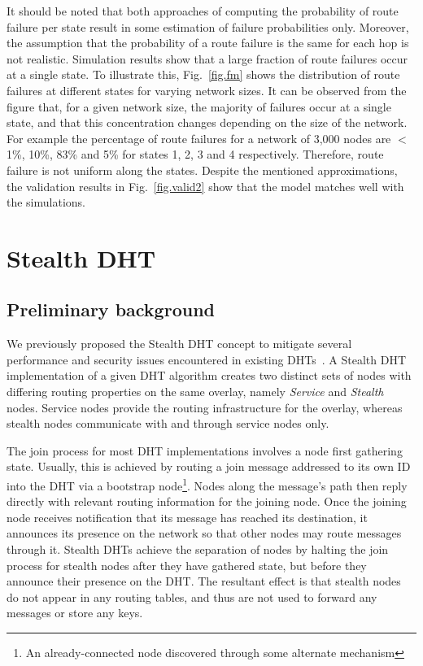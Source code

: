 \documentclass[10pt,twocolumn]{article}
\begin{document}
It should be noted that both approaches of computing the probability of route
failure per state result in some  estimation of failure probabilities only.
Moreover, the assumption that the probability of a route failure is the same
for each hop is not realistic. Simulation results show that a large fraction of
route failures occur at a single state. To illustrate this, Fig.~\ref{fig.fm}
shows the distribution of route failures  at different states for varying
network sizes. It can be
observed from the figure that, for a given network size, the majority of
failures occur at a single state, and that this concentration changes depending
on the size of the network. For example the percentage of route failures for a
network of 3,000 nodes are $<$1\%, 10\%, 83\% and 5\% for states 1, 2, 3 and 4
respectively. Therefore, route failure is not uniform along the states. Despite
the mentioned approximations, the validation results in Fig.~\ref{fig.valid2}
show that the model matches well with the simulations.

\section{Stealth DHT}
\label{sect.stealth}
\subsection{Preliminary background}
We previously proposed the Stealth DHT concept to mitigate several performance
and security issues encountered in existing DHTs~\cite{Brampton06Stealth}. A Stealth
 DHT implementation
of a given DHT algorithm creates two distinct sets of nodes with differing
routing properties on the same overlay, namely \emph{Service} and
\emph{Stealth} nodes. Service nodes provide the routing infrastructure for the
overlay, whereas stealth nodes communicate with and through service nodes only.

The join process for most DHT implementations involves a node first gathering
state. Usually, this is achieved by routing a join message addressed to its own
ID into the DHT via a bootstrap node\footnote{An already-connected node
discovered through some alternate mechanism}. Nodes along the message's path
then reply directly with relevant routing information for the joining node.
Once the joining node receives notification that its message has reached its
destination, it announces its presence on the network so that other nodes may
route messages through it. Stealth DHTs achieve the separation of nodes by
halting the join process for stealth nodes after they have gathered state, but
before they announce their presence on the DHT. The resultant effect is that
stealth nodes do not appear in any routing tables, and thus are not used to
forward any messages or store any keys.
\end{document}
